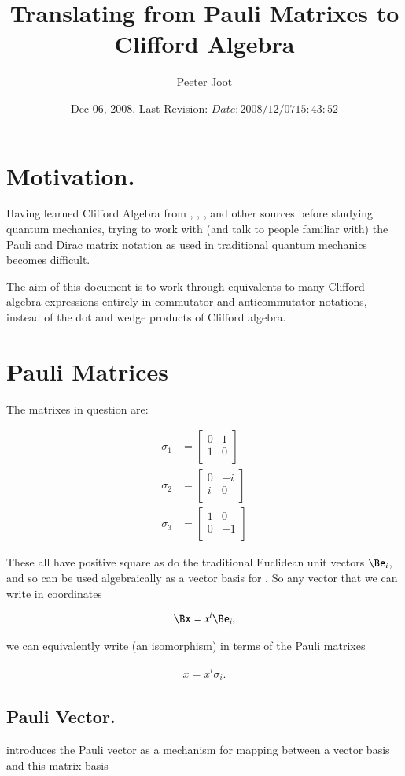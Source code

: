 \documentclass{article}
\title{Translating from Pauli Matrixes to Clifford Algebra}
\author{Peeter Joot}
\date{ Dec 06, 2008.  Last Revision: $Date: 2008/12/07 15:43:52 $ }
\newcommand{\PauliX}[0]{
\begin{bmatrix}
0 & 1 \\
1 & 0 \\
\end{bmatrix}
}
\newcommand{\PauliY}[0]{
\begin{bmatrix}
0 & -i \\
i & 0 \\
\end{bmatrix}
}
\newcommand{\PauliZ}[0]{
\begin{bmatrix}
1 & 0 \\
0 & -1 \\
\end{bmatrix}
}
\begin{document}
\maketitle{}

\tableofcontents

\section{ Motivation. }

Having learned Clifford Algebra from 
\cite{doran2003gap}, \cite{hestenes1999nfc}, \cite{dorst2007gac}, and other sources
before studying quantum mechanics, trying to work with (and talk to people familiar with) the Pauli and Dirac matrix notation as used in
traditional quantum mechanics becomes difficult.

The aim of this document is to work through equivalents to many Clifford algebra expressions entirely in
commutator and anticommutator notations, instead of the dot and wedge products of Clifford algebra.

\section{ Pauli Matrices }

The matrixes in question are:

\begin{align}
\sigma_1 &= \PauliX \\
\sigma_2 &= \PauliY \\
\sigma_3 &= \PauliZ
\end{align}

These all have positive square as do the traditional Euclidean unit vectors $\Be_i$, and so can be used algebraically as a vector basis for .  So any vector that we
can write in coordinates

\begin{align*}
\Bx = x^i \Be_i,
\end{align*}

we can equivalently write (an isomorphism) in terms of the Pauli matrixes

\begin{align}\label{eqn:vectorInPauliBasis}
x = x^i \sigma_i.
\end{align}

\subsection{ Pauli Vector. }
\cite{wikipauli} introduces the Pauli vector as a mechanism for mapping between a vector basis and this matrix basis
\end{document}
